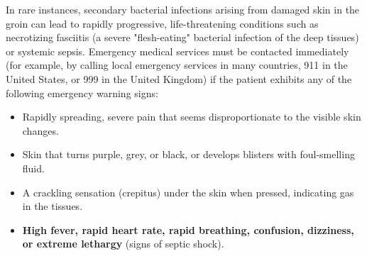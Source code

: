In rare instances, secondary bacterial infections arising from damaged skin in the groin can lead to rapidly progressive, life-threatening conditions such as necrotizing fasciitis (a severe "flesh-eating" bacterial infection of the deep tissues) or systemic sepsis. Emergency medical services must be contacted immediately (for example, by calling local emergency services in many countries, 911 in the United States, or 999 in the United Kingdom) if the patient exhibits any of the following emergency warning signs:
\begin{itemize}
    \item Rapidly spreading, severe pain that seems disproportionate to the visible skin changes.
    \item Skin that turns purple, grey, or black, or develops blisters with foul-smelling fluid.
    \item A crackling sensation (crepitus) under the skin when pressed, indicating gas in the tissues.
    \item \textbf{High fever, rapid heart rate, rapid breathing, confusion, dizziness, or extreme lethargy} (signs of septic shock).
\end{itemize}

